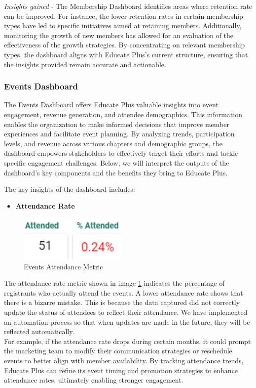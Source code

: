\documentclass[11pt,a4paper,]{article}
\providecommand{\tightlist}{%
  \setlength{\itemsep}{0pt}\setlength{\parskip}{0pt}}
\begin{document}
\emph{Insights gained} - The Membership Dashboard identifies areas where retention rate can be improved. For instance, the lower retention rates in certain membership types have led to specific initiatives aimed at retaining members. Additionally, monitoring the growth of new members has allowed for an evaluation of the effectiveness of the growth strategies. By concentrating on relevant membership types, the dashboard aligns with Educate Plus's current structure, ensuring that the insights provided remain accurate and actionable.

\subsubsection{Events Dashboard}\label{events-dashboard}

The Events Dashboard offers Educate Plus valuable insights into event engagement, revenue generation, and attendee demographics. This information enables the organization to make informed decisions that improve member experiences and facilitate event planning. By analyzing trends, participation levels, and revenue across various chapters and demographic groups, the dashboard empowers stakeholders to effectively target their efforts and tackle specific engagement challenges. Below, we will interpret the outputs of the dashboard's key components and the benefits they bring to Educate Plus.

The key insights of the dashboard includes:

\begin{itemize}
\tightlist
\item
  \textbf{Attendance Rate}
\end{itemize}

\begin{figure}[H]

{\centering \includegraphics[width=200px]{Images/attendance_rate} 

}

\caption{Events Attendance Metric}\label{fig:attendance}
\end{figure}

The attendance rate metric shown in image \ref{fig:attendance} indicates the percentage of registrants who actually attend the events. A lower attendance rate shows that there is a bizarre mistake. This is because the data captured did not correctly update the status of attendees to reflect their attendance. We have implemented an automation process so that when updates are made in the future, they will be reflected automatically.\\
For example, if the attendance rate drops during certain months, it could prompt the marketing team to modify their communication strategies or reschedule events to better align with member availability. By tracking attendance trends, Educate Plus can refine its event timing and promotion strategies to enhance attendance rates, ultimately enabling stronger engagement.
\end{document}
